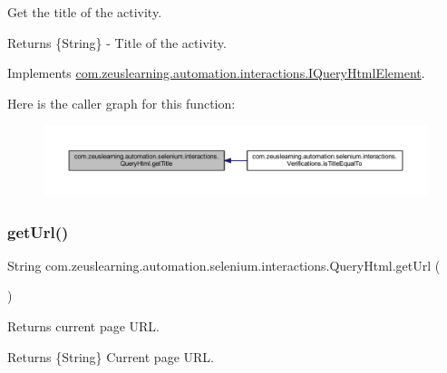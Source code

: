 Get the title of the activity.

\begin{DoxyReturn}{Returns}
\{String\} -\/ Title of the activity. 
\end{DoxyReturn}


Implements \hyperlink{interfacecom_1_1zeuslearning_1_1automation_1_1interactions_1_1IQueryHtmlElement_a0d97c8b92f42a892ba27faef88421fb0}{com.\+zeuslearning.\+automation.\+interactions.\+I\+Query\+Html\+Element}.

Here is the caller graph for this function\+:
\nopagebreak
\begin{figure}[H]
\begin{center}
\leavevmode
\includegraphics[width=350pt]{dc/d41/classcom_1_1zeuslearning_1_1automation_1_1selenium_1_1interactions_1_1QueryHtml_ad0bcb480f1543a6d81c3c83bd0a15773_icgraph}
\end{center}
\end{figure}
\hypertarget{classcom_1_1zeuslearning_1_1automation_1_1selenium_1_1interactions_1_1QueryHtml_ad06d213ffd977196fb656e8e8bac6808}{}\label{classcom_1_1zeuslearning_1_1automation_1_1selenium_1_1interactions_1_1QueryHtml_ad06d213ffd977196fb656e8e8bac6808} 
\subsubsection{\texorpdfstring{get\+Url()}{getUrl()}}
{\footnotesize\ttfamily String com.\+zeuslearning.\+automation.\+selenium.\+interactions.\+Query\+Html.\+get\+Url (\begin{DoxyParamCaption}{ }\end{DoxyParamCaption})\hspace{0.3cm}{\ttfamily [inline]}}

Returns current page U\+RL.

\begin{DoxyReturn}{Returns}
\{String\} Current page U\+RL. 
\end{DoxyReturn}


